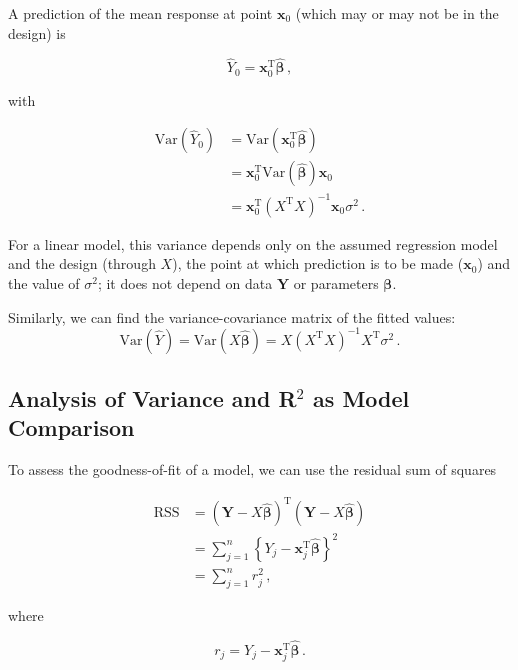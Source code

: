 \documentclass[
]{book}
\theoremstyle{definition}
\theoremstyle{definition}
\theoremstyle{definition}
\theoremstyle{definition}
\theoremstyle{remark}
\begin{document}
A prediction of the mean response at point \(\boldsymbol{x}_0\) (which may or may not be in the design) is

\[
\hat{Y}_0 = \boldsymbol{x}_0^{\textrm{T}}\hat{\boldsymbol{\beta}}\,,
\]

with

\begin{align*}
\textrm{Var}(\hat{Y}_0) & = \textrm{Var}\left(\boldsymbol{x}_0^{\textrm{T}}\hat{\boldsymbol{\beta}}\right) \\
& = \boldsymbol{x}_0^{\textrm{T}}\textrm{Var}(\hat{\boldsymbol{\beta}})\boldsymbol{x}_0 \\
& = \boldsymbol{x}_0^{\textrm{T}}(X^{\textrm{T}}X)^{-1}\boldsymbol{x}_0\sigma^{2}\,.
\end{align*}

For a linear model, this variance depends only on the assumed regression model and the design (through \(X\)), the point at which prediction is to be made (\(\boldsymbol{x}_0\)) and the value of \(\sigma^2\); it does not depend on data \(\boldsymbol{Y}\) or parameters \(\boldsymbol{\beta}\).

Similarly, we can find the variance-covariance matrix of the fitted values:
\[
\textrm{Var}(\hat{Y})=\textrm{Var}(X\hat{\boldsymbol{\beta}})=X(X^{\textrm{T}}X)^{-1}X^{\textrm{T}}\sigma^{2}\,.
\]

\hypertarget{analysis-of-variance-and-r2-as-model-comparison}{%
\subsection{\texorpdfstring{Analysis of Variance and R\(^{2}\) as Model Comparison}{Analysis of Variance and R\^{}\{2\} as Model Comparison}}\label{analysis-of-variance-and-r2-as-model-comparison}}

To assess the goodness-of-fit of a model, we can use the residual sum of squares

\begin{align*}
\textrm{RSS} & = (\boldsymbol{Y} - X\hat{\boldsymbol{\beta}})^{\textrm{T}} (\boldsymbol{Y} - X\hat{\boldsymbol{\beta}})\\
& = \sum^{n}_{j=1}\left\{Y_{j}-\boldsymbol{x}_{j}^{\textrm{T}}\hat{\boldsymbol{\beta}}\right\}^{2}\\
& = \sum^{n}_{j=1}r_{j}^{2}\,,
\end{align*}

where

\[
r_{j}=Y_{j}-\boldsymbol{x}_{j}^{\textrm{T}}\hat{\boldsymbol{\beta}}\,.
\]
\end{document}
